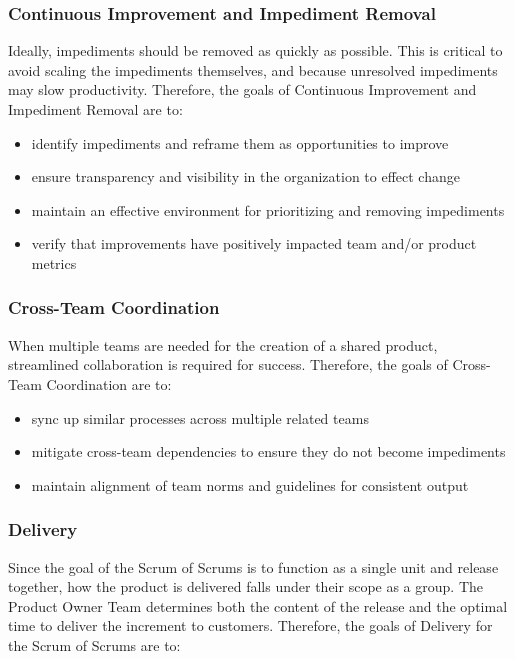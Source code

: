 \documentclass[12pt,a4paper,parskip=full]{scrartcl}
\begin{document}
\subsubsection{Continuous Improvement and Impediment
Removal}\label{Continuous-improvement-and-impediment-removal}

Ideally, impediments should be removed as quickly as possible. This is critical to avoid scaling the impediments themselves, and because unresolved impediments may slow productivity. Therefore, the goals of Continuous Improvement and Impediment Removal are to:


\begin{itemize}
\itemsep1pt\parskip0pt
\item
  identify impediments and reframe them as opportunities to improve
\item
  ensure transparency and visibility in the organization to effect
  change
\item
  maintain an effective environment for prioritizing and removing
  impediments
\item
  verify that improvements have positively impacted team and/or product
  metrics
\end{itemize}

\subsubsection{Cross-Team Coordination}\label{cross-team-coordination}

When multiple teams are needed for the creation of a shared product,
streamlined collaboration is required for success. Therefore, the goals
of Cross-Team Coordination are to:

\begin{itemize}
\itemsep1pt\parskip0pt
\item
  sync up similar processes across multiple related teams
\item
  mitigate cross-team dependencies to ensure they do not become
  impediments
\item
  maintain alignment of team norms and guidelines for consistent output
\end{itemize}

\subsubsection{Delivery}\label{Delivery}

Since the goal of the Scrum of Scrums is to function as a single unit and release together, how the product is delivered falls under their scope as a group. The Product Owner Team determines both the content of the release and the optimal time to deliver the increment to customers.  Therefore, the goals of Delivery for the Scrum of Scrums are to:
\end{document}
